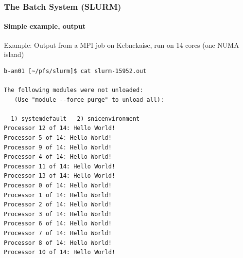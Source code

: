\documentclass{beamer}
\begin{document}
\begin{frame}[fragile]\frametitle{The Batch System (SLURM)}\framesubtitle{Simple example, output} 

  \begin{block}{}
    \justify
Example: Output from a MPI job on Kebnekaise, run on 14 cores (one NUMA island)
  \end{block}

  \begin{block}{}
\begin{tiny}
\begin{verbatim}
b-an01 [~/pfs/slurm]$ cat slurm-15952.out 

The following modules were not unloaded:
   (Use "module --force purge" to unload all):

  1) systemdefault   2) snicenvironment
Processor 12 of 14: Hello World!
Processor 5 of 14: Hello World!
Processor 9 of 14: Hello World!
Processor 4 of 14: Hello World!
Processor 11 of 14: Hello World!
Processor 13 of 14: Hello World!
Processor 0 of 14: Hello World!
Processor 1 of 14: Hello World!
Processor 2 of 14: Hello World!
Processor 3 of 14: Hello World!
Processor 6 of 14: Hello World!
Processor 7 of 14: Hello World!
Processor 8 of 14: Hello World!
Processor 10 of 14: Hello World!
\end{verbatim}
\end{tiny}
  \end{block}

\end{frame}





\end{document}
